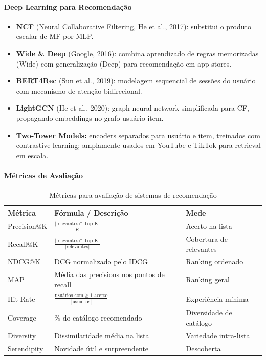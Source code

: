 \documentclass[12pt,a4paper]{article}
\begin{document}
\paragraph{Deep Learning para Recomendação}

\begin{itemize}
  \item \textbf{NCF} (Neural Collaborative Filtering, He et al., 2017): substitui o produto escalar de MF por MLP.
  \item \textbf{Wide \& Deep} (Google, 2016): combina aprendizado de regras memorizadas (Wide) com generalização (Deep) para recomendação em app stores.
  \item \textbf{BERT4Rec} (Sun et al., 2019): modelagem sequencial de sessões do usuário com mecanismo de atenção bidirecional.
  \item \textbf{LightGCN} (He et al., 2020): graph neural network simplificada para CF, propagando embeddings no grafo usuário-item.
  \item \textbf{Two-Tower Models:} encoders separados para usuário e item, treinados com contrastive learning; amplamente usados em YouTube e TikTok para retrieval em escala.
\end{itemize}

\paragraph{Métricas de Avaliação}

\begin{table}[ht]
\centering
\caption{Métricas para avaliação de sistemas de recomendação}
\begin{tabular}{@{}lll@{}}
\toprule
\textbf{Métrica} & \textbf{Fórmula / Descrição} & \textbf{Mede} \\
\midrule
Precision@K & $\frac{|\text{relevantes} \cap \text{Top-K}|}{K}$ & Acerto na lista \\
Recall@K & $\frac{|\text{relevantes} \cap \text{Top-K}|}{|\text{relevantes}|}$ & Cobertura de relevantes \\
NDCG@K & DCG normalizado pelo IDCG & Ranking ordenado \\
MAP & Média das precisions nos pontos de recall & Ranking geral \\
Hit Rate & $\frac{\text{usuários com} \geq 1 \text{ acerto}}{|\text{usuários}|}$ & Experiência mínima \\
Coverage & \% do catálogo recomendado & Diversidade de catálogo \\
Diversity & Dissimilaridade média na lista & Variedade intra-lista \\
Serendipity & Novidade útil e surpreendente & Descoberta \\
\bottomrule
\end{tabular}
\end{table}
\end{document}
